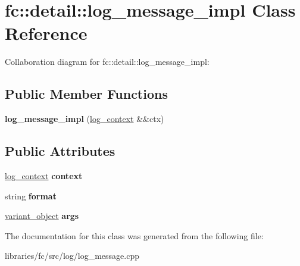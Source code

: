 \hypertarget{classfc_1_1detail_1_1log__message__impl}{}\section{fc\+:\+:detail\+:\+:log\+\_\+message\+\_\+impl Class Reference}
\label{classfc_1_1detail_1_1log__message__impl}


Collaboration diagram for fc\+:\+:detail\+:\+:log\+\_\+message\+\_\+impl\+:
\subsection*{Public Member Functions}
\begin{DoxyCompactItemize}
\item 
\mbox{\label{classfc_1_1detail_1_1log__message__impl_aaa31093e872a3323ea953c1aeaa05bd6}} 
{\bfseries log\+\_\+message\+\_\+impl} (\mbox{\hyperlink{classfc_1_1log__context}{log\+\_\+context}} \&\&ctx)
\end{DoxyCompactItemize}
\subsection*{Public Attributes}
\begin{DoxyCompactItemize}
\item 
\mbox{\label{classfc_1_1detail_1_1log__message__impl_a1981b1d549f2fb9b687366ec62ad9499}} 
\mbox{\hyperlink{classfc_1_1log__context}{log\+\_\+context}} {\bfseries context}
\item 
\mbox{\label{classfc_1_1detail_1_1log__message__impl_a5c78e9cde7f2d6ca3ca045153040f6be}} 
string {\bfseries format}
\item 
\mbox{\label{classfc_1_1detail_1_1log__message__impl_a2fbb0632fc59675d54685e953bc91c8b}} 
\mbox{\hyperlink{classfc_1_1variant__object}{variant\+\_\+object}} {\bfseries args}
\end{DoxyCompactItemize}


The documentation for this class was generated from the following file\+:\begin{DoxyCompactItemize}
\item 
libraries/fc/src/log/log\+\_\+message.\+cpp\end{DoxyCompactItemize}
